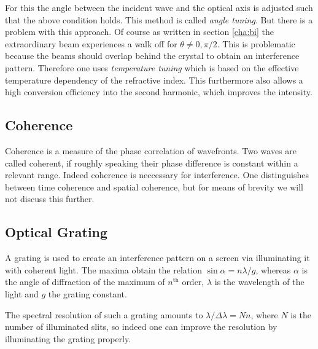 \documentclass{protokoll_en}
\begin{document}
For this the angle between the incident wave and the optical axis is adjusted such that the above condition holds. This method is called \emph{angle tuning}. But there is a problem with this approach. Of course as written in section \ref{cha:bi} the extraordinary beam experiences a walk off for $\theta \neq 0, \pi/2$. This is problematic because the beams should overlap behind the crystal to obtain an interference pattern. Therefore one uses \emph{temperature tuning} which is based on the effective temperature dependency of the refractive index. This furthermore also allows a high conversion efficiency into the second harmonic, which improves the intensity.


\subsection{Coherence}
Coherence is a measure of the phase correlation of wavefronts. Two waves are called coherent, if roughly speaking their phase difference is constant within a relevant range. Indeed coherence is neccessary for interference. One distinguishes between time coherence and spatial coherence, but for means of brevity we will not discuss this further.

\subsection{Optical Grating}
A grating is used to create an interference pattern on a screen via illuminating it with coherent light. The maxima obtain the relation $\sin{\alpha} = n \lambda/g$, whereas $\alpha$ is the angle of diffraction of the maximum of $n^{\mathrm{th}}$ order, $\lambda$ is the wavelength of the light and $g$ the grating constant.

The spectral resolution of such a grating amounts to $\lambda/\Delta\lambda = N n$, where $N$ is the number of illuminated slits, so indeed one can improve the resolution by illuminating the grating properly.
\end{document}
